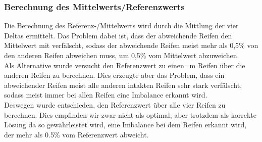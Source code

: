 \subsubsection{Berechnung des Mittelwerts/Referenzwerts}
Die Berechnung des Referenz-/Mittelwerts wird durch die Mittlung der vier Deltas ermittelt. Das Problem dabei ist, dass der abweichende Reifen den Mittelwert mit verfälscht, sodass der abweichende Reifen meist mehr als 0,5\% von den anderen Reifen abweichen muss, um 0,5\% vom Mittelwert abzuweichen.\\
Als Alternative wurde versucht den Referenzwert zu einen=m Reifen über die anderen Reifen zu berechnen. Dies erzeugte aber das Problem, dass ein abweichender Reifen meist alle anderen intakten Reifen sehr stark verfälscht, sodass meist immer bei allen Reifen eine Imbalance erkannt wird.\\
Deswegen wurde entschieden, den Referenzwert über alle vier Reifen zu berechnen. Dies empfinden wir zwar nicht als optimal, aber trotzdem als korrekte Lösung da so gewährleistet wird, eine Imbalance bei dem Reifen erkannt wird, der mehr als 0.5\% vom Referenzwert abweicht.\\